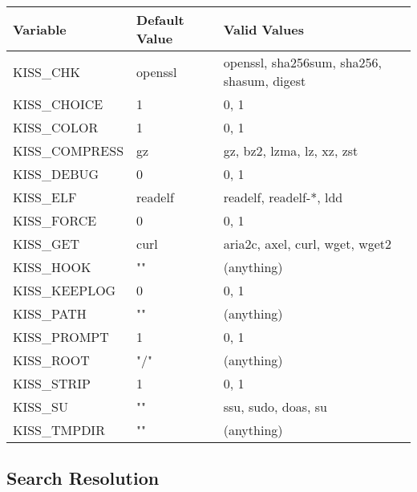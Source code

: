 \documentclass{article}
\begin{document}
\begin{center}
\begin{table}[]
\begin{tabular}{|l|l|l|}
  \hline
  Variable       & Default Value & Valid Values \\ \hline
  KISS\_CHK      & openssl       & openssl, sha256sum, sha256, shasum, digest \\
  KISS\_CHOICE   & 1             & 0, 1                                       \\
  KISS\_COLOR    & 1             & 0, 1                                       \\
  KISS\_COMPRESS & gz            & gz, bz2, lzma, lz, xz, zst                 \\
  KISS\_DEBUG    & 0             & 0, 1                                       \\
  KISS\_ELF      & readelf       & readelf, readelf-*, ldd                    \\
  KISS\_FORCE    & 0             & 0, 1                                       \\
  KISS\_GET      & curl          & aria2c, axel, curl, wget, wget2            \\
  KISS\_HOOK     & ""            & (anything)                                 \\
  KISS\_KEEPLOG  & 0             & 0, 1                                       \\
  KISS\_PATH     & ""            & (anything)                                 \\
  KISS\_PROMPT   & 1             & 0, 1                                       \\
  KISS\_ROOT     & "/"           & (anything)                                 \\
  KISS\_STRIP    & 1             & 0, 1                                       \\
  KISS\_SU       & ""            & ssu, sudo, doas, su                        \\
  KISS\_TMPDIR   & ""            & (anything)                                 \\
  \hline
\end{tabular}
\end{table}
\end{center}

\pagebreak
\subsection{Search Resolution}
\end{document}
